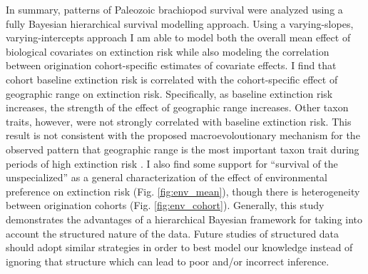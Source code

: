 \documentclass[12pt,letterpaper]{article}
\begin{document}
In summary, patterns of Paleozoic brachiopod survival were analyzed using a fully Bayesian hierarchical survival modelling approach. Using a varying-slopes, varying-intercepts approach I am able to model both the overall mean effect of biological covariates on extinction risk while also modeling the correlation between origination cohort-specific estimates of covariate effects. I find that cohort baseline extinction risk is correlated with the cohort-specific effect of geographic range on extinction risk. Specifically, as baseline extinction risk increases, the strength of the effect of geographic range increases. Other taxon traits, however, were not strongly correlated with baseline extinction risk. This result is not consistent with the proposed macroevoloutionary mechanism for the observed pattern that geographic range is the most important taxon trait during periods of high extinction risk \citet{Jablonski1986}. I also find some support for ``survival of the unspecialized'' \citep{Simpson1944,Liow2004a,Liow2007b,Nurnberg2013a,Nurnberg2015} as a general characterization of the effect of environmental preference on extinction risk (Fig. \ref{fig:env_mean}), though there is heterogeneity between origination cohorts (Fig. \ref{fig:env_cohort}). Generally, this study demonstrates the advantages of a hierarchical Bayesian framework for taking into account the structured nature of the data. Future studies of structured data should adopt similar strategies in order to best model our knowledge instead of ignoring that structure which can lead to poor and/or incorrect inference.
\end{document}
